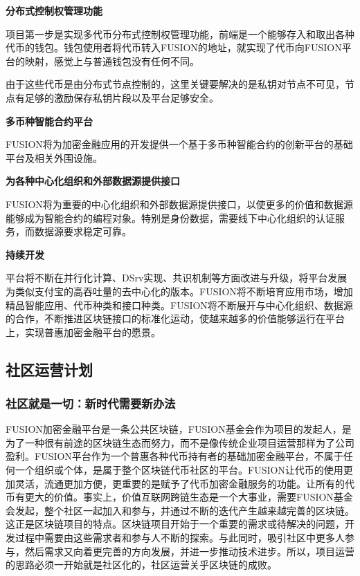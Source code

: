 \documentclass[a4paper,12pt]{article}
\begin{document}
\textbf{分布式控制权管理功能}

项目第一步是实现多代币分布式控制权管理功能，前端是一个能够存入和取出各种代币的钱包。钱包使用者将代币转入FUSION的地址，就实现了代币向FUSION平台的映射，感觉上与普通钱包没有任何不同。

由于这些代币是由分布式节点控制的，这里关键要解决的是私钥对节点不可见，节点有足够的激励保存私钥片段以及平台足够安全。

\textbf{多币种智能合约平台}

FUSION将为加密金融应用的开发提供一个基于多币种智能合约的创新平台的基础平台及相关外围设施。

\textbf{为各种中心化组织和外部数据源提供接口}

FUSION将为重要的中心化组织和外部数据源提供接口，以使更多的价值和数据源能够成为智能合约的编程对象。特别是身份数据，需要线下中心化组织的认证服务，而数据源要求稳定可靠。

\textbf{持续开发}

平台将不断在并行化计算、DSrv实现、共识机制等方面改进与升级，将平台发展为类似支付宝的高吞吐量的去中心化的版本。FUSION将不断培育应用市场，增加精品智能应用、代币种类和接口种类。FUSION将不断展开与中心化组织、数据源的合作，不断推进区块链接口的标准化运动，使越来越多的价值能够运行在平台上，实现普惠加密金融平台的愿景。

\subsection{社区运营计划}

\subsubsection{社区就是一切：新时代需要新办法}

FUSION加密金融平台是一条公共区块链，FUSION基金会作为项目的发起人，是为了一种很有前途的区块链生态而努力，而不是像传统企业项目运营那样为了公司盈利。FUSION平台作为一个普惠各种代币持有者的基础加密金融平台，不属于任何一个组织或个体，是属于整个区块链代币社区的平台。FUSION让代币的使用更加灵活，流通更加方便，更重要的是赋予了代币加密金融服务的功能。让所有的代币有更大的价值。事实上，价值互联网跨链生态是一个大事业，需要FUSION基金会发起，整个社区一起加入和参与，并通过不断的迭代产生越来越完善的区块链。这正是区块链项目的特点。区块链项目开始于一个重要的需求或待解决的问题，开发过程中需要由这些需求者和参与人不断的探索。与此同时，吸引社区中更多人参与，然后需求又向着更完善的方向发展，并进一步推动技术进步。所以，项目运营的思路必须一开始就是社区化的，社区运营关乎区块链的成败。
\end{document}
